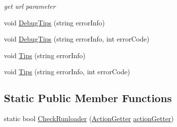 \begin{DoxyCompactItemize}
\begin{DoxyCompactList}\small\item\em get url parameter \end{DoxyCompactList}\item 
void \mbox{\hyperlink{class_t_net_1_1_service_1_1_base_struct_adea489f13ef08bb121d64c89f1f868f4}{Debug\+Tips}} (string error\+Info)
\item 
void \mbox{\hyperlink{class_t_net_1_1_service_1_1_base_struct_a92472634c6a34ade397024712ba33454}{Debug\+Tips}} (string error\+Info, int error\+Code)
\item 
void \mbox{\hyperlink{class_t_net_1_1_service_1_1_base_struct_a91813acc6f5a913bea40d44ee86a17f7}{Tips}} (string error\+Info)
\item 
void \mbox{\hyperlink{class_t_net_1_1_service_1_1_base_struct_a8ee6447a71fc8eb25d2e3b38fe170b34}{Tips}} (string error\+Info, int error\+Code)
\end{DoxyCompactItemize}
\subsection*{Static Public Member Functions}
\begin{DoxyCompactItemize}
\item 
static bool \mbox{\hyperlink{class_t_net_1_1_service_1_1_base_struct_adf493fa9ef410d27eec2d82b8beea0e6}{Check\+Runloader}} (\mbox{\hyperlink{class_t_net_1_1_service_1_1_action_getter}{Action\+Getter}} \mbox{\hyperlink{class_t_net_1_1_service_1_1_game_struct_a14dcf224eb5a73e2c0b3bee4fe359dd8}{action\+Getter}})
\end{DoxyCompactItemize}
